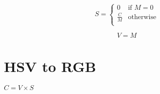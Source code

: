 \documentclass[12pt]{book}
\begin{document}
$$
S =
\begin{cases}
0 & \text{if $M = 0$}\\
\frac{C}{M}& \text{otherwise} \\
\end{cases}
$$

$$V = M$$

\section{HSV to RGB}

$C = V \times S$


\printbibliography
\end{document}
